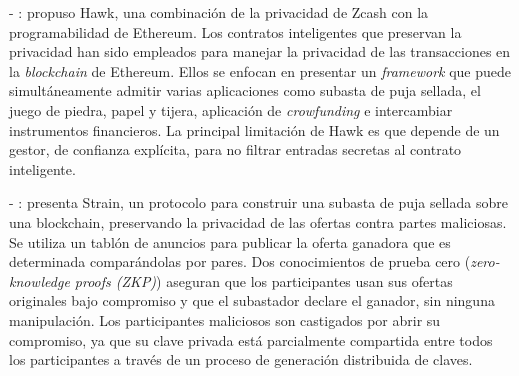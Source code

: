     - \cite{kosba2016hawk}: propuso Hawk, una combinación de la privacidad de Zcash con la programabilidad
    de Ethereum. Los contratos inteligentes que preservan la privacidad han sido empleados para manejar la 
    privacidad de las transacciones en la \textit{blockchain} de Ethereum. Ellos se enfocan en presentar
    un \textit{framework} que puede simultáneamente admitir varias aplicaciones como subasta de puja sellada,
    el juego de piedra, papel y tijera, aplicación de \textit{crowfunding} e intercambiar instrumentos 
    financieros. La principal limitación de Hawk es que depende de un gestor, de confianza explícita,
    para no filtrar entradas secretas al contrato inteligente.




    - \cite{blass2017strain}: presenta Strain, un protocolo para construir una subasta de puja sellada sobre
    una blockchain, preservando la privacidad de las ofertas contra partes maliciosas. Se utiliza un tablón
    de anuncios para publicar la oferta ganadora que es determinada comparándolas por pares. Dos conocimientos
    de prueba cero (\textit{zero-knowledge proofs (ZKP)}) aseguran que los participantes usan sus ofertas 
    originales bajo compromiso y que el
    subastador declare el ganador, sin ninguna manipulación. Los participantes maliciosos son castigados por
    abrir su compromiso, ya que su clave privada está parcialmente compartida entre todos los participantes
    a través de un proceso de generación distribuida de claves.



